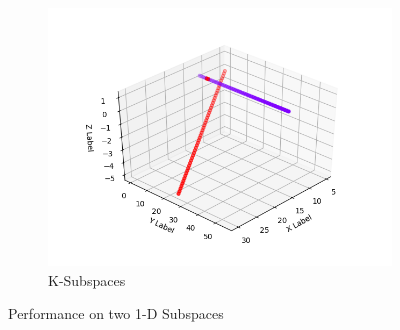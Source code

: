 \documentclass[12pt]{article}
\begin{document}
\begin{enumerate}
\begin{figure}
    \begin{subfigure}[b]{0.3\textwidth}
        \includegraphics[width=\textwidth]{ksubfigures/2linesksub.png}
        \caption{K-Subspaces}
        \label{fig:ksub}
    \end{subfigure}
    \caption{Performance on two 1-D Subspaces}\label{fig:2lineswhole}
\end{figure}



\end{enumerate}
\end{document}
